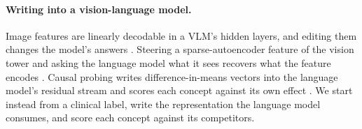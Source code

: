 \paragraph{Writing into a vision-language model.}
Image features are linearly decodable in a VLM's hidden layers, and editing them changes the model's answers \citep{rajaram2025lineofsight}. Steering a sparse-autoencoder feature of the vision tower and asking the language model what it sees recovers what the feature encodes \citep{ferrando2026explain}. Causal probing writes difference-in-means vectors into the language model's residual stream and scores each concept against its own effect \citep{deng2026causal}. We start instead from a clinical label, write the representation the language model consumes, and score each concept against its competitors.
